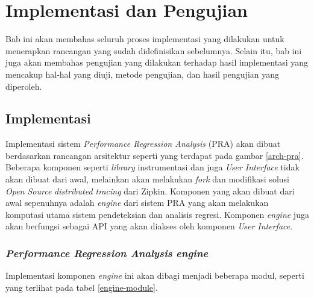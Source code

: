 \chapter{Implementasi dan Pengujian}

Bab ini akan membahas seluruh proses implementasi yang dilakukan untuk menerapkan rancangan yang sudah didefinisikan sebelumnya. Selain itu, bab ini juga akan membahas pengujian yang dilakukan terhadap hasil implementasi yang mencakup hal-hal yang diuji, metode pengujian, dan hasil pengujian yang diperoleh. 


\section{Implementasi}
Implementasi sistem \textit{Performance Regression Analysis} (PRA) akan dibuat berdasarkan rancangan arsitektur seperti yang terdapat pada gambar \ref{arch-pra}. Beberapa komponen seperti \textit{library} instrumentasi dan juga \textit{User Interface} tidak akan dibuat dari awal, melainkan akan melakukan \textit{fork} dan modifikasi solusi \textit{Open Source} \textit{distributed tracing} dari Zipkin. Komponen yang akan dibuat dari awal sepenuhnya adalah \textit{engine} dari sistem PRA yang akan melakukan komputasi utama sistem pendeteksian dan analisis regresi. Komponen \textit{engine} juga akan berfungsi sebagai API yang akan diakses oleh komponen \textit{User Interface}.



\subsection{\textit{Performance Regression Analysis} \textit{engine}}
Implementasi komponen \textit{engine} ini akan dibagi menjadi beberapa modul, seperti yang terlihat pada tabel \ref{engine-module}.


